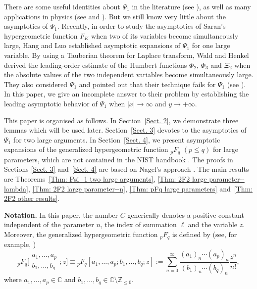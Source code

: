 \documentclass[10pt,a4paper]{amsart}
\numberwithin{equation}{section}
\newcommand{\CC}{\ensuremath{\mathbb{C}}}
\newcommand{\ZZ}{\ensuremath{\mathbb{Z}}}
\begin{document}
There are some useful identities about $\Psi_1$ in the literature (see \cite{Brychkov_Saad-2014,Choi_Hasanov-2011,ElHalba-2014,Humbert-1922}), as well as many applications in physics (see \cite[equation~(5.2)]{Ahbli_Mouayn-2018} and \cite{Belafhal_Saad-2017,Borghi-2023}). But we still know very little about the asymptotics of $\Psi_1$. Recently, in order to study the asymptotics of Saran's hypergeometric function $F_K$ when two of its variables become simultaneously large, Hang and Luo \cite{Hang_Luo-2024} established asymptotic expansions of $\Psi_1$ for one large variable. By using a Tauberian theorem for Laplace transform, Wald and Henkel \cite{Wald_Henkel-2018} derived the leading-order estimate of the Humbert functions $\Phi_2$, $\Phi_3$ and $\Xi_2$ when the absolute values of the two independent variables become simultaneously large. They also considered $\Psi_1$ and pointed out that their technique fails for $\Psi_1$ (see \cite[p.~99]{Wald_Henkel-2018}). In this paper, we give an incomplete answer to their problem by establishing the leading asymptotic behavior of $\Psi_1$ when $|x|\to \infty$ and $y\to +\infty$.

This paper is organised as follows. In Section~\ref{Sect. 2}, we demonstrate three lemmas which will be used later. Section~\ref{Sect. 3} devotes to the asymptotics of $\Psi_1$ for two large arguments. In Section~\ref{Sect. 4}, we present asymptotic expansions of the generalized hypergeometric function $_pF_q$ $(p\leqslant q)$ for large parameters, which are not contained in the NIST handbook \cite{NIST-Handbook}. The proofs in Sections \ref{Sect. 3} and~\ref{Sect. 4} are based on Nagel's approach \cite{Nagel-2004}. The main results are Theorems~\ref{Thm: Psi_1 two large arguments}, \ref{Thm: 2F2 large parameter--lambda}, \ref{Thm: 2F2 large parameter--n}, \ref{Thm: pFq large parameters} and~\ref{Thm: 2F2 other results}.

\textbf{Notation.}
In this paper, the number $C$ generically denotes a positive constant independent of the parameter $n$, the index of summation $\ell$ and the variable $z$. Moreover, the generalized hypergeometric function $_pF_q$ is defined by (see, for example, \cite[p.~404]{NIST-Handbook})
	\begin{equation}\label{pFq definition}
		{}_pF_q\bigg[\begin{matrix}
			a_1,\dots,a_p\\
			b_1,\dots,b_q
		\end{matrix};z\bigg]
		\equiv
		{}_pF_q[
		a_1,\dots,a_p;
		b_1,\dots,b_q;z]
		:=\sum_{n=0}^{\infty}\frac{(a_1)_n\cdots(a_p)_n}{(b_1)_n\cdots(b_q)_n}\frac{z^n}{n!},
	\end{equation}
	where $a_1,\dots,a_p\in\CC$ and $b_1,\dots,b_q\in\CC\setminus\ZZ_{\leqslant 0}$.
\end{document}
